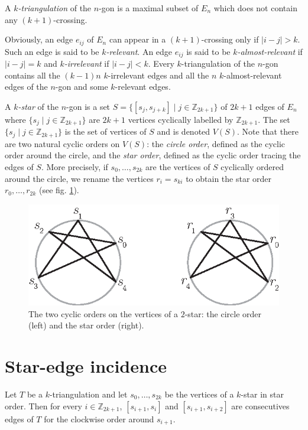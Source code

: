 \documentclass[12pt]{amsart}
\begin{document}
A \emph{$k$-triangulation} of the $n$-gon is a maximal subset of $E_n$ which does not contain any $(k+1)$-crossing.

Obviously, an edge $e_{ij}$ of $E_n$ can appear in a $(k+1)$-crossing only if $|i-j|>k$. Such an edge is said to be \emph{$k$-relevant}. An edge $e_{ij}$ is said to be \emph{$k$-almost-relevant} if $|i-j|=k$ and \emph{$k$-irrelevant} if $|i-j|<k$.
Every $k$-triangulation of the $n$-gon contains all the $(k-1)n$ $k$-irrelevant edges and all the $n$ $k$-almost-relevant edges of the $n$-gon and some $k$-relevant edges.

A \emph{$k$-star} of the $n$-gon is a set $S=\{[s_j,s_{j+k}]\;|\; j\in\mathbb{Z}_{2k+1}\}$ of $2k+1$ edges of $E_n$ where $\{s_j\;|\; j\in\mathbb{Z}_{2k+1}\}$ are $2k+1$ vertices cyclically labelled by $\mathbb{Z}_{2k+1}$. The set $\{s_j\;|\; j\in\mathbb{Z}_{2k+1}\}$ is the set of vertices of $S$ and is denoted $V(S)$. Note that there are two natural cyclic orders on $V(S)$: the \emph{circle order}, defined as the cyclic order around the circle, and the \emph{star order}, defined as the cyclic order tracing the edges of $S$. More precisely, if $s_0,\ldots,s_{2k}$ are the vertices of $S$ cyclically ordered around the circle, we rename the vertices $r_i=s_{ki}$ to obtain the star order $r_0,\ldots,r_{2k}$ (see fig. \ref{star}).

\begin{figure}
\centerline{\includegraphics[scale=1]{star.eps}}
\caption{\small{The two cyclic orders on the vertices of a $2$-star: the circle order (left) and the star order (right).}}\label{star}
\end{figure}


\section{Star-edge incidence}

\begin{lemma}\label{starcaracterization}
Let $T$ be a $k$-triangulation and let $s_0,\ldots,s_{2k}$ be the vertices of a $k$-star in star order. Then for every $i\in\mathbb{Z}_{2k+1}$, $[s_{i+1},s_{i}]$ and $[s_{i+1},s_{i+2}]$ are consecutives edges of $T$ for the clockwise order around $s_{i+1}$.
\end{lemma}
\end{document}
